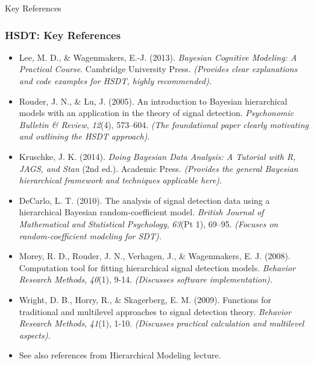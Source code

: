 \documentclass[aspectratio=169]{beamer}
\begin{document}
\begin{frame}[allowframebreaks]{Key References}
    \frametitle{HSDT: Key References}
    \footnotesize
    \begin{itemize}
        \item Lee, M. D., \& Wagenmakers, E.-J. (2013). \textit{Bayesian Cognitive Modeling: A Practical Course}. Cambridge University Press. \textit{(Provides clear explanations and code examples for HSDT, highly recommended).}
        \item Rouder, J. N., \& Lu, J. (2005). An introduction to Bayesian hierarchical models with an application in the theory of signal detection. \textit{Psychonomic Bulletin \& Review}, \textit{12}(4), 573–604. \textit{(The foundational paper clearly motivating and outlining the HSDT approach).}
        \item Kruschke, J. K. (2014). \textit{Doing Bayesian Data Analysis: A Tutorial with R, JAGS, and Stan} (2nd ed.). Academic Press. \textit{(Provides the general Bayesian hierarchical framework and techniques applicable here).}
        \item DeCarlo, L. T. (2010). The analysis of signal detection data using a hierarchical Bayesian random-coefficient model. \textit{British Journal of Mathematical and Statistical Psychology}, \textit{63}(Pt 1), 69–95. \textit{(Focuses on random-coefficient modeling for SDT).}
        \item Morey, R. D., Rouder, J. N., Verhagen, J., \& Wagenmakers, E. J. (2008). Computation tool for fitting hierarchical signal detection models. \textit{Behavior Research Methods}, \textit{40}(1), 9-14. \textit{(Discusses software implementation).}
        \item Wright, D. B., Horry, R., \& Skagerberg, E. M. (2009). Functions for traditional and multilevel approaches to signal detection theory. \textit{Behavior Research Methods}, \textit{41}(1), 1-10. \textit{(Discusses practical calculation and multilevel aspects).}
        \item See also references from Hierarchical Modeling lecture.
    \end{itemize}
\end{frame}
\end{document}
